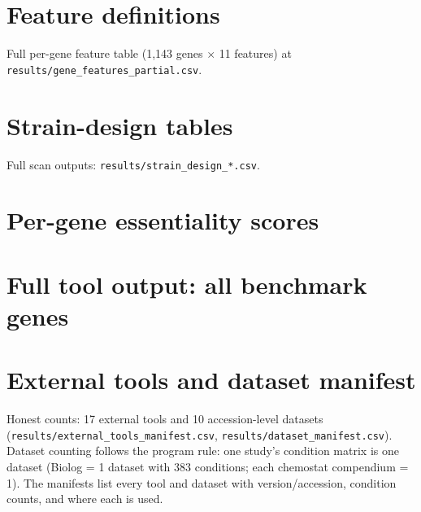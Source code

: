 \documentclass[12pt]{article}
\begin{document}
\section{Feature definitions}
Full per-gene feature table (1{,}143 genes $\times$ 11 features) at
\texttt{results/gene\_features\_partial.csv}.
\section{Strain-design tables}
Full scan outputs: \texttt{results/strain\_design\_*.csv}.
\section{Per-gene essentiality scores}

\section{Full tool output: all benchmark genes}

\section{External tools and dataset manifest}
Honest counts: 17 external tools and 10 accession-level datasets
(\texttt{results/external\_tools\_manifest.csv},
\texttt{results/dataset\_manifest.csv}). Dataset counting follows the
program rule: one study's condition matrix is one dataset (Biolog = 1
dataset with 383 conditions; each chemostat compendium = 1). The
manifests list every tool and dataset with version/accession, condition
counts, and where each is used.
\end{document}
